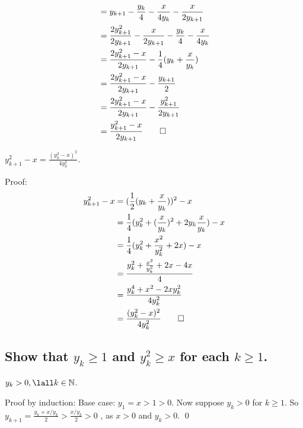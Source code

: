 \documentclass[10pt, letterpaper, titlepage]{article}
\begin{document}
\begin{multicols}{2}
\begin{align*}
              &= y_{k+1}- \frac{y_k}{4} - \frac{x}{4y_k} - \frac{x}{2y_{k+1}} \\ 
              &= \frac{2y_{k+1}^2}{2y_{k+1}} - \frac{x}{2y_{k+1}} - \frac{y_k}{4} - \frac{x}{4y_k}\\ 
              &= \frac{2y_{k+1}^2 - x}{2y_{k+1}} - \frac{1}{4}(y_k+ \frac{x}{y_k})\\ 
              &= \frac{2y_{k+1}^2 - x}{2y_{k+1}} - \frac{y_{k+1}}{2}\\ 
              &= \frac{2y_{k+1}^2 - x}{2y_{k+1}} - \frac{y_{k+1}^2}{2y_{k+1}}\\ 
              &= \frac{y_{k+1}^2 - x}{2y_{k+1}} \qed
            \end{align*}
  
          \begin{proposition}
            $y_{k+1}^2 - x = \frac{(y_k^2 - x)^2}{4y_k^2}$.
          \end{proposition}
            Proof:
            \begin{align*}
              y_{k+1}^2 - x
              &= (\frac{1}{2} (y_k + \frac{x}{y_k}))^2 - x \\ 
              &= \frac{1}{4} (y_k^2 + (\frac{x}{y_k})^2 + 2y_k\frac{x}{y_k}) - x \\ 
              &= \frac{1}{4} (y_k^2 + \frac{x^2}{y_k^2} + 2x) - x \\ 
              &= \frac{y_k^2 + \frac{x^2}{y_k^2} + 2x - 4x}{4} \\ 
              &= \frac{y_k^4 + x^2 - 2xy_k^2}{4y_k^2} \\ 
              &= \frac{(y_k^2 - x)^2}{4y_k^2} \qed
            \end{align*}
        \end{multicols}

      \newpage
      \subsection{Show that $y_k \geq 1$ and $y_k^2 \geq x$ for each $k \geq 1$.}
        \begin{lemma}
          $y_k > 0, \lall k \in\N$.
        \end{lemma}
          Proof by induction:
          Base case: $y_1 = x > 1 > 0$.
          Now suppose $y_k > 0$ for $k \geq 1$.
          So
          \(
            y_{k+1} 
            = \frac{y_k + x / y_k}{2} 
            > \frac{x / y_k}{2} 
            > 0
          \)
          , as $x > 0$ and $y_k >0$. 
          \qed
\end{document}
